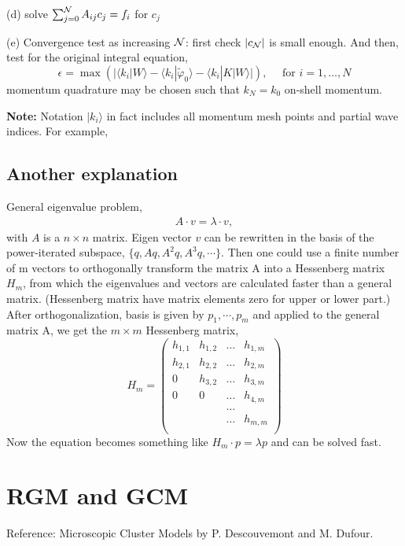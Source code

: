 \documentclass[11pt]{article}
\newcommand{\bea}{\begin{eqnarray}}
\newcommand{\eea}{\end{eqnarray}}
\newcommand{\la}{\langle}
\newcommand{\ra}{\rangle}
\begin{document}
(d) solve $\sum_{j=0}^{\cal N} A_{ij} c_j = f_i$ for $c_{j}$

(e) Convergence test as increasing ${\cal N}$:
   first check $|c_{\cal N}|$ is small enough. 
    And then, test for the original integral equation, 
    $$\epsilon=\max(|\la k_{i}|W\ra -\la k_{i}|\tilde{\varphi}_0\ra 
                                     -\la k_{i}|K|W\ra |), \quad \mbox{ for } i=1,\dots, N
    $$
   momentum quadrature may be chosen such that $k_{N}=k_0$ on-shell momentum. 
   
 {\bf Note:} Notation $|k_i\ra$ in fact includes all momentum mesh points and partial wave indices. For example, 


\subsection{Another explanation}
General eigenvalue problem,
\bea 
A\cdot v = \lambda \cdot v, 
\eea 
with $A$ is a $n\times n$ matrix. Eigen vector $v$ can be rewritten in the basis
of the power-iterated subspace, $\{q, Aq, A^2q, A^3 q,\cdots  \}$. Then
one could use a finite number of m vectors to orthogonally transform the matrix A into 
a Hessenberg matrix $H_m$, from which the eigenvalues and vectors are calculated faster than a 
general matrix. (Hessenberg matrix have matrix elements zero for upper or lower part.)
After orthogonalization, basis is given by $p_1,\cdots,p_m$ and applied to the general matrix A,
we get the $m\times m$ Hessenberg matrix,
\begin{equation} 
H_m =\left(\begin{array}{cccc} 
            h_{1,1} & h_{1,2} & \dots & h_{1,m} \\
            h_{2,1} & h_{2,2} & \dots & h_{2,m} \\
            0       & h_{3,2} & \dots & h_{3,m} \\
            0       &  0      & \dots & h_{4,m} \\
                    &         & \dots &         \\
                    &         & \dots & h_{m,m} \\ 
           \end{array} \right) 
\end{equation} 
Now the equation becomes something like $H_{m} \cdot p = \lambda p$ and can be solved 
fast. 
\section{RGM and GCM}
Reference: Microscopic Cluster Models by P. Descouvemont and M. Dufour.
\end{document}
